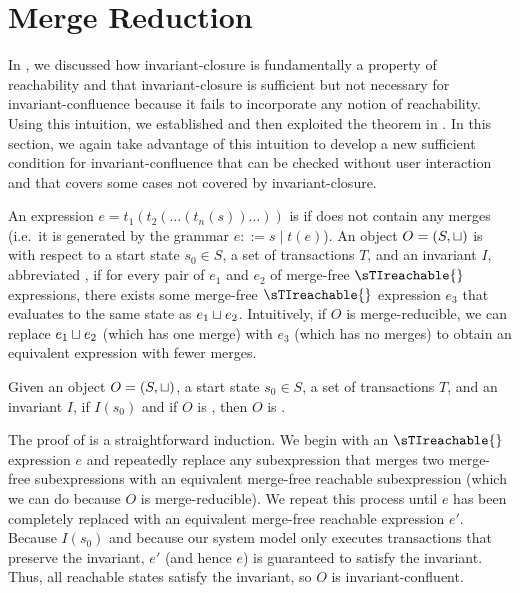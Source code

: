 \section{Merge Reduction}
In , we discussed how invariant-closure is
fundamentally a property of reachability and that invariant-closure is
sufficient but not necessary for invariant-confluence because it fails to
incorporate any notion of reachability. Using this intuition, we established
 and then exploited the theorem in
. In this section, we again take
advantage of this intuition to develop a new sufficient condition for
invariant-confluence that can be checked without user interaction and that
covers some cases not covered by invariant-closure.

An expression $e = t_1(t_2(\ldots(t_n(s))\ldots))$ is  if
does not contain any merges (i.e.\ it is generated by the grammar $e ::= s \mid
t(e)$). An object $O = (S, \sqcup)$ is  with respect to
a start state $s_0 \in S$, a set of transactions $T$, and an invariant $I$,
abbreviated , if for every pair of $e_1$ and $e_2$
of merge-free $\sTIreachable{}$ expressions, there exists some merge-free
$\sTIreachable{}$ expression $e_3$ that evaluates to the same state as $e_1
\sqcup e_2$. Intuitively, if $O$ is merge-reducible, we can replace $e_1 \sqcup
e_2$ (which has one merge) with $e_3$ (which has no merges) to obtain an
equivalent expression with fewer merges.

\begin{theorem}
  Given an object $O = (S, \sqcup)$, a start state $s_0 \in S$, a set of
  transactions $T$, and an invariant $I$, if $I(s_0)$ and if $O$ is
  \sTImergereducible{}, then $O$ is \sTIconfluent{}.
\end{theorem}

The proof of  is a straightforward
induction. We begin with an $\sTIreachable{}$ expression $e$ and repeatedly
replace any subexpression that merges two merge-free subexpressions with an
equivalent merge-free reachable subexpression (which we can do because $O$ is
merge-reducible). We repeat this process until $e$ has been completely replaced
with an equivalent merge-free reachable expression $e'$. Because $I(s_0)$ and
because our system model only executes transactions that preserve the
invariant, $e'$ (and hence $e$) is guaranteed to satisfy the invariant. Thus,
all reachable states satisfy the invariant, so $O$ is invariant-confluent.

